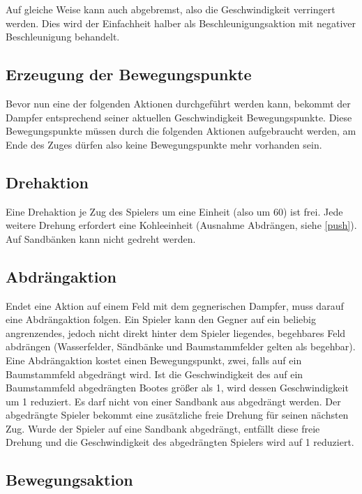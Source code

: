 \documentclass[12pt,a4paper, ngerman, oneside]{scrartcl}
\begin{document}
Auf gleiche Weise kann auch abgebremst, also die Geschwindigkeit verringert
werden. Dies wird der Einfachheit halber als Beschleunigungsaktion mit negativer
Beschleunigung behandelt.

\subsection{Erzeugung der Bewegungspunkte}

Bevor nun eine der folgenden Aktionen durchgeführt werden kann, bekommt der
Dampfer entsprechend seiner aktuellen Geschwindigkeit Bewegungspunkte. Diese
Bewegungspunkte müssen durch die folgenden Aktionen aufgebraucht werden, am Ende
des Zuges dürfen also keine Bewegungspunkte mehr vorhanden sein.

\subsection{\label{turn}Drehaktion}

Eine Drehaktion je Zug des Spielers um eine Einheit (also um 60\degree) ist
frei. Jede weitere Drehung erfordert eine Kohleeinheit (Ausnahme Abdrängen,
siehe \ref{push}). Auf Sandbänken kann nicht gedreht werden.


\subsection{\label{push}Abdrängaktion}

Endet eine Aktion auf einem Feld mit dem gegnerischen Dampfer, muss darauf eine
Abdrängaktion folgen. Ein Spieler kann den Gegner auf ein beliebig angrenzendes,
jedoch nicht direkt hinter dem Spieler liegendes, begehbares Feld abdrängen
(\label{passierbar}Wasserfelder, Sändbänke und Baumstammfelder gelten als
begehbar). Eine Abdrängaktion kostet einen Bewegungspunkt, zwei, falls auf ein
Baumstammfeld abgedrängt wird. Ist die Geschwindigkeit des auf ein Baumstammfeld
abgedrängten Bootes größer als 1, wird dessen Geschwindigkeit um 1 reduziert. Es
darf nicht von einer Sandbank aus abgedrängt werden. Der abgedrängte Spieler
bekommt eine zusätzliche freie Drehung für seinen nächsten Zug. Wurde der
Spieler auf eine Sandbank abgedrängt, entfällt diese freie Drehung und die
Geschwindigkeit des abgedrängten Spielers wird auf 1 reduziert.

\subsection{\label{step}Bewegungsaktion}
\end{document}
